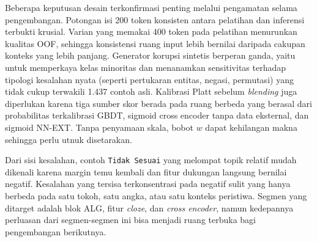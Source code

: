 Beberapa keputusan desain terkonfirmasi penting melalui pengamatan selama pengembangan. Potongan isi 200 token konsisten antara pelatihan dan inferensi terbukti krusial. Varian yang memakai 400 token pada pelatihan menurunkan kualitas OOF, sehingga konsistensi ruang input lebih bernilai daripada cakupan konteks yang lebih panjang. Generator korupsi sintetis berperan ganda, yaitu untuk memperkaya kelas minoritas dan menanamkan sensitivitas terhadap tipologi kesalahan nyata (seperti pertukaran entitas, negasi, permutasi) yang tidak cukup terwakili 1.437 contoh asli. Kalibrasi Platt sebelum \textit{blending} juga diperlukan karena tiga sumber skor berada pada ruang berbeda yang berasal dari probabilitas terkalibrasi GBDT, sigmoid cross encoder tanpa data eksternal, dan sigmoid NN-EXT. Tanpa penyamaan skala, bobot $w$ dapat kehilangan makna sehingga perlu utnuk disetarakan.

Dari sisi kesalahan, contoh \texttt{Tidak Sesuai} yang melompat topik relatif mudah dikenali karena margin temu kembali dan fitur dukungan langsung bernilai negatif. Kesalahan yang tersisa terkonsentrasi pada negatif sulit yang hanya berbeda pada satu tokoh, satu angka, atau satu konteks peristiwa. Segmen yang ditarget adalah blok ALG, fitur \textit{cloze}, dan \textit{cross encoder}, namun kedepannya perluasan dari segmen-segmen ini bisa menjadi ruang terbuka bagi pengembangan berikutnya.
